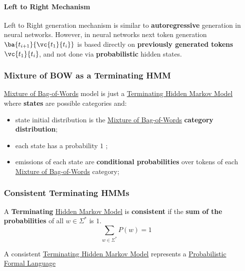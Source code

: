 \paragraph{Left to Right Mechanism}\label{par:lm_left_to_right_mechanism} %
Left to Right generation mechanism is similar to \textbf{autoregressive} generation in neural networks.
However, in neural networks next token generation $\ba{t_{i+1}}{\vc{t_1}{t_i}}$ is based directly on \textbf{previously generated tokens} $\vc{t_1}{t_i}$, and not done via \textbf{probabilistic} hidden states.
%
\subsubsection{Mixture of BOW as a Terminating HMM}\label{sub:lm_mixture_of_bow_as_a_terminating_hmm} %
\hyperref[sub:lm_mixture_of_bag_of_words]{Mixture of Bag-of-Words} model is just a \hyperref[sub:lm_terminating_hidden_markov_models]{Terminating Hidden Markov Model} where \textbf{states} are possible categories and:
\begin{itemize}
    \item state initial distribution is the \hyperref[sub:lm_mixture_of_bag_of_words]{Mixture of Bag-of-Words} \textbf{category distribution};
    \item each state has a probability $1$ ;
    \item emissions of each state are \textbf{conditional probabilities} over tokens of each \hyperref[sub:lm_mixture_of_bag_of_words]{Mixture of Bag-of-Words} category;
\end{itemize}
%
\subsubsection{Consistent Terminating HMMs}\label{sub:lm_consistent_terminating_hmms} %
A \textbf{Terminating} \hyperref[def:hmm]{Hidden Markov Model} is \textbf{consistent} if the \textbf{sum of the probabilities} of all $w\in\Sigma^*$ is $1$.
\[
    \sum_{w\in\Sigma^*}P(w) = 1
\]
\begin{note}
    A consistent \hyperref[sub:lm_terminating_hidden_markov_models]{Terminating Hidden Markov Model} represents a \hyperref[def:pfl]{Probabilistic Formal Language}
\end{note}
%
